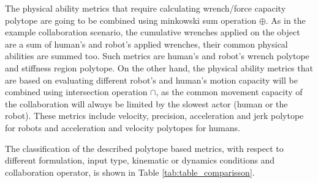 The physical ability metrics that require calculating wrench/force capacity polytope are going to be combined using minkowski sum operation $\oplus$. As in the example collaboration scenario, the cumulative wrenches applied on the object are a sum of human's and robot's applied wrenches, their common physical abilities are summed too. Such metrics are human's and robot's wrench polytope and stiffness region polytope. 
On the other hand, the physical ability metrics that are based on evaluating different robot's  and human's motion capacity will be combined using intersection operation $\cap$, as the common movement capacity of the collaboration will always be limited by the slowest actor (human or the robot). These metrics include velocity, precision, acceleration and jerk polytope for robots and acceleration and velocity polytopes for humans.

The classification of the described polytope based metrics, with respect to different formulation, input type, kinematic or dynamics conditions and collaboration operator, is shown in Table \ref{tab:table_comparisson}.


